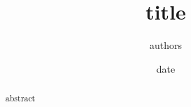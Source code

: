 \documentclass[12pt,a4paper]{memoir}
\title{{{title}}}
\author{{{authors}}}
\date{{{date}}}
\begin{document}
\frontmatter
\maketitle
\begin{abstract}
{{abstract}}
\end{abstract}
\tableofcontents
\mainmatter



\backmatter


\end{document}
